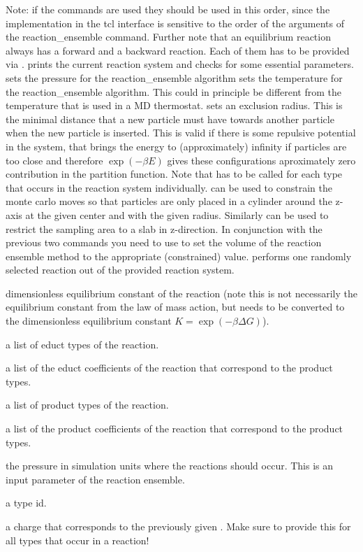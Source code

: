   Note: if the commands are used they should be used in this order, since the implementation in the tcl interface is sensitive to the order of the arguments of the reaction\_ensemble command. Further note that an equilibrium reaction always has a forward and a backward reaction. Each of them has to be provided via . 
 prints the current reaction system and checks for some essential parameters.
 sets the pressure for the reaction\_ensemble algorithm
 sets the temperature for the reaction\_ensemble algorithm. This could in principle be different from the temperature that is used in a MD thermostat.
 sets an exclusion radius. This is the minimal distance that a new particle must have towards another particle when the new particle is inserted. This is valid if there is some repulsive potential in the system, that brings the energy to (approximately) infinity if particles are too close and therefore $\exp(-\beta E)$ gives these configurations aproximately zero contribution in the partition function.
Note that  has to be called for each type that occurs in the reaction system individually.
 can be used to constrain the monte carlo moves so that particles are only placed in a cylinder around the z-axis at the given center and with the given radius. Similarly  can be used to restrict the sampling area to a slab in z-direction. In conjunction with the previous two commands you need to use  to set the volume of the reaction ensemble method to the appropriate (constrained) value.
 performs one randomly selected reaction out of the provided reaction system.

  \begin{arguments}
  \item[\var{K}] dimensionless equilibrium constant of the reaction (note this is not necessarily the equilibrium constant from the law of mass action, but needs to be converted to the dimensionless equilibrium constant $K=\exp(-\beta \Delta G)$).
\item[\var{list\_educt\_types}] a list of educt types of the reaction.
\item[\var{list\_educt\_coefficients}] a list of the educt coefficients of the reaction that correspond to the product types.
\item[\var{list\_product\_types}] a list of product types of the reaction.
\item[\var{list\_product\_coefficients}] a list of the product coefficients of the reaction that correspond to the product types.
\item[\var{desired\_pressure\_at\_which\_reactions\_occur}] the pressure in simulation units where the reactions should occur. This is an input parameter of the reaction ensemble.
\item[\var{type}] a type id.
\item[\var{charge}] a charge that corresponds to the previously given . Make sure to provide this for all types that occur in a reaction!
  \end{arguments}


